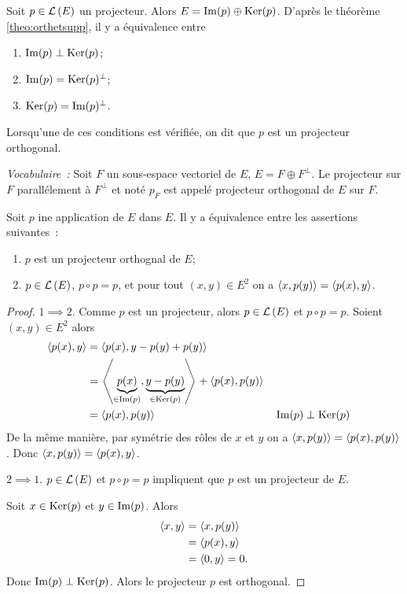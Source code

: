 Soit \(p \in \mathcal{L}\left(E\right)\) un projecteur. Alors \(E = \operatorname{Im}(p)\oplus \operatorname{Ker}(p)\). 
D'après le théorème~
\ref{theo:orthetsupp}, il y a équivalence entre
\begin{enumerate}
  \item \(\operatorname{Im}(p) \perp \operatorname{Ker}(p)\);
  \item \(\operatorname{Im}(p) = \operatorname{Ker}(p)^\perp\);
  \item \(\operatorname{Ker}(p) = \operatorname{Im}(p)^\perp\).
\end{enumerate}
Lorsqu'une de ces conditions est vérifiée, on dit que \(p\) est un projecteur 
orthogonal.

\emph{Vocabulaire~:} Soit \(F\) un sous-espace vectoriel de \(E\), \(E = F 
\oplus F^\perp\). Le projecteur sur \(F\) parallélement à \(F^\perp\) et noté 
\(p_F\) est appelé projecteur orthogonal de \(E\) sur \(F\).

\begin{theo}
  Soit \(p\) ine application de \(E\) dans \(E\). Il y a équivalence entre les 
  assertions suivantes~:
  \begin{enumerate}
    \item \(p\) est un projecteur orthognal de \(E\);
    \item \(p \in \mathcal{L}\left(E\right)\), \(p \circ p =p\), et pour tout \((x,y) \in E^2\) 
      on a \(\left\langle{x},{p(y)}\right\rangle=\left\langle{p(x)},{y}\right\rangle\).
  \end{enumerate}
\end{theo}
\begin{proof}
  \(1 \implies 2\). Comme \(p\) est un projecteur, alors \(p \in \mathcal{L}\left(E\right)\) et 
  \(p \circ p =p\). Soient \((x,y) \in E^2\) alors
  \begin{align*}
    \left\langle{p(x)},{y}\right\rangle &=  \left\langle{p(x)},{y-p(y)+p(y)}\right\rangle \\
    &= \left\langle{\underbrace{p(x)}_{\in \operatorname{Im}(p)}},{\underbrace{y-p(y)}_{\in 
    \operatorname{Ker}(p)}}\right\rangle+\left\langle{p(x)},{p(y)}\right\rangle \\
    &=  \left\langle{p(x)},{p(y)}\right\rangle && \operatorname{Im}(p) \perp \operatorname{Ker}(p)
  \end{align*}
  De la même manière, par symétrie des rôles de \(x\) et \(y\) on a 
  \(\left\langle{x},{p(y)}\right\rangle=\left\langle{p(x)},{p(y)}\right\rangle\). Donc 
  \(\left\langle{x},{p(y)}\right\rangle=\left\langle{p(x)},{y}\right\rangle\).

  \(2 \implies 1\). \(p \in \mathcal{L}\left(E\right)\) et \(p \circ p =p\) impliquent que 
  \(p\) est un projecteur de \(E\).

  Soit \(x \in \operatorname{Ker}(p)\) et \(y \in \operatorname{Im}(p)\). Alors
  \begin{align*}
    \left\langle{x},{y}\right\rangle &= \left\langle{x},{p(y)}\right\rangle \\
    &=\left\langle{p(x)},{y}\right\rangle \\
    &=\left\langle{0},{y}\right\rangle=0.
  \end{align*}
  Donc \(\operatorname{Im}(p) \perp \operatorname{Ker}(p)\). Alors le projecteur \(p\) est orthogonal.
\end{proof}

